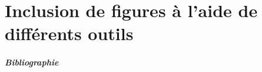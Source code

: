 \documentclass{beamer}
\begin{document}

\part{Inclusion de figures à l'aide de différents outils}






\begin{frame}
  \frametitle{Bibliographie}

\nocite{*}


\end{frame}


\end{document}
